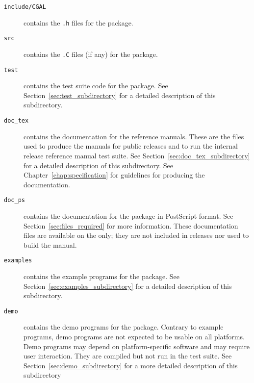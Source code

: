 \begin{description}
  \item[{\tt include/CGAL}]
       contains the {\tt .h} files for the package.
  \item[{\tt src}]
       contains the {\tt .C} files (if any) for the package.
  \item[{\tt test}]
       contains the test suite code for the package.  See
       Section~\ref{sec:test_subdirectory} for a detailed description of this 
       subdirectory.
  \item[{\tt doc\_tex}]
       contains the documentation for the reference manuals.
       These are the files used to produce the manuals for public releases and
       to run the internal release reference manual test suite.
       See Section~\ref{sec:doc_tex_subdirectory} for a detailed description 
       of this subdirectory.
       See Chapter~\ref{chap:specification} for guidelines for producing
       the documentation.
  \item[{\tt doc\_ps}]
       contains the documentation for the package in PostScript 
       format. See Section~\ref{sec:files_required} for more information. 
       These documentation files are available on the 
 only; they are not
       included in releases nor used to build the manual.
  \item[{\tt examples}]
       contains the example programs for the package.
       See Section~\ref{sec:examples_subdirectory} for a detailed 
       description of this subdirectory.
  \item[{\tt demo}]
       contains the demo programs for the package.
       Contrary to example programs, demo programs are not expected to be
       usable on all platforms. Demo programs may depend on platform-specific
       software and may require user interaction.  They are compiled but not
       run in the test suite. See Section~\ref{sec:demo_subdirectory} for a
       more detailed description of this subdirectory

\end{description}
